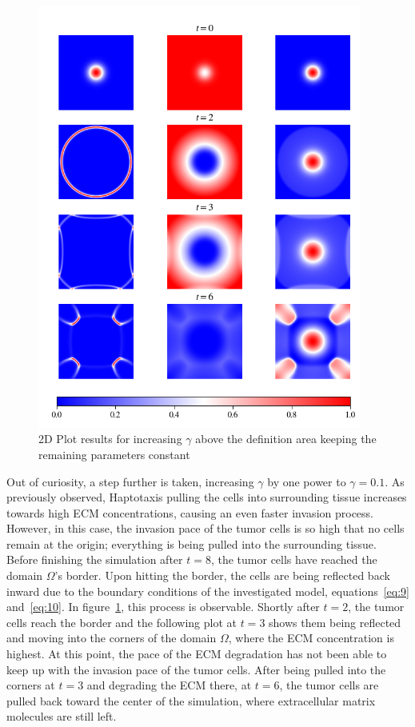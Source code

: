 \begin{figure}[h!]
 \centering
 \includegraphics[width=0.95\textwidth]{resources/images/gamma_2D_plot_.png}
 \caption{2D Plot results for increasing $\gamma$ above the definition area keeping the remaining parameters constant}
 \label{fig:gamma_2D_plot}
\end{figure}
Out of curiosity, a step further is taken, increasing $\gamma$ by one power to $\gamma=0.1$. As previously observed, Haptotaxis pulling the cells into surrounding tissue increases towards high ECM concentrations, causing an even faster invasion process. However, in this case, the invasion pace of the tumor cells is so high that no cells remain at the origin; everything is being pulled into the surrounding tissue. Before finishing the simulation after $t=8$, the tumor cells have reached the domain $\Omega$'s border. Upon hitting the border, the cells are being reflected back inward due to the boundary conditions of the investigated model, equations~\ref{eq:9} and~\ref{eq:10}. In figure~\ref{fig:gamma_2D_plot}, this process is observable. Shortly after $t=2$, the tumor cells reach the border and the following plot at $t=3$ shows them being reflected and moving into the corners of the domain $\Omega$, where the ECM concentration is highest. At this point, the pace of the ECM degradation has not been able to keep up with the invasion pace of the tumor cells. After being pulled into the corners at $t=3$ and degrading the ECM there, at $t=6$, the tumor cells are pulled back toward the center of the simulation, where extracellular matrix molecules are still left.

